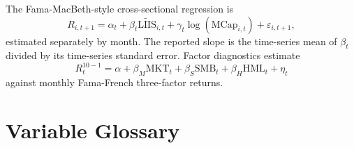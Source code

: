 \documentclass[11pt]{article}
\newcommand{\LIIS}{\mathrm{LIIS}}
\begin{document}
The Fama-MacBeth-style cross-sectional regression is
\begin{equation}
R_{i,t+1} =
\alpha_t + \beta_t \widetilde{\LIIS}_{i,t}
+ \gamma_t \log(\mathrm{MCap}_{i,t})+\varepsilon_{i,t+1},
\end{equation}
estimated separately by month. The reported slope is the time-series mean of
$\beta_t$ divided by its time-series standard error. Factor diagnostics estimate
\begin{equation}
R^{10-1}_{t}=\alpha+\beta_M \mathrm{MKT}_t+\beta_S\mathrm{SMB}_t+
\beta_H\mathrm{HML}_t+\eta_t
\end{equation}
against monthly Fama-French three-factor returns.

\section{Variable Glossary}
\end{document}
